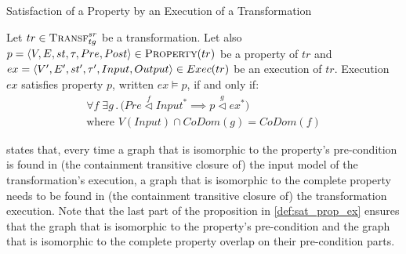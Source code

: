 \begin{definition}{Satisfaction of a Property by an Execution of a Transformation\\}
\label{def:sat_prop_ex}

Let $tr\in \textsc{Transf}^{sr}_{tg}$ be a transformation. Let also $p = \langle V,E,st,\tau,\\Pre,Post\rangle \in \textsc{Property}(tr)$ be a property of $tr$ and $ex = \langle V',E',\\st',\tau',Input,Output\rangle \in Exec(tr)$ be an execution of $tr$. Execution $ex$ satisfies property $p$,  written $ex \models p$, if and only if:
\begin{multline*}
\forall f\; \exists g\,.\,\big(Pre \stackrel{f}{\vartriangleleft} Input^{*} \implies p \stackrel{g}{\vartriangleleft} ex^*\big)\\\text{where } V(Input)\cap CoDom(g) = CoDom(f)
\end{multline*}
\end{definition}

 states that, every time a graph that is isomorphic to the property's pre-condition is found in (the containment transitive closure of) the input model of the transformation's execution, a graph that is isomorphic to the complete property needs to be found in (the containment transitive closure of) the transformation execution. Note that the last part of the proposition in \cref{def:sat_prop_ex} ensures that the graph that is isomorphic to the property's pre-condition and the graph that is isomorphic to the complete property overlap on their pre-condition parts.


